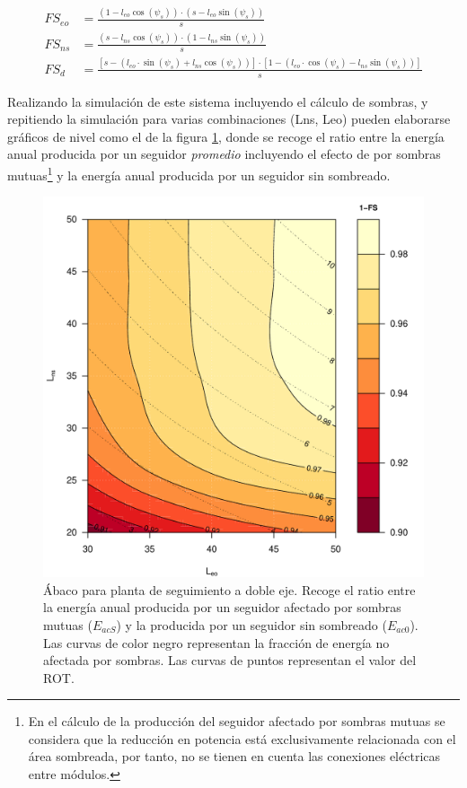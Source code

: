 \begin{align}
FS_{eo} & =\frac{(1-l_{eo}\cos(\psi_{s}))\cdot(s-l_{eo}\sin(\psi_{s}))}{s}\\
FS_{ns} & =\frac{(s-l_{ns}\cos(\psi_{s}))\cdot(1-l_{ns}\sin(\psi_{s}))}{s}\\
FS_{d} & =\frac{\left[s-\left(l_{eo}\cdot\sin(\psi_{s})+l_{ns}\cos(\psi_{s})\right)\right]\cdot\left[1-\left(l_{eo}\cdot\cos(\psi_{s})-l_{ns}\sin(\psi_{s})\right)\right]}{s}
\end{align}

Realizando la simulación de este sistema incluyendo el cálculo de sombras, y repitiendo la simulación para varias combinaciones (Lns, Leo) pueden elaborarse gráficos de nivel como el de la figura \ref{fig:abaco-sombras}, donde se recoge el ratio entre la energía anual producida por un seguidor \emph{promedio} incluyendo el efecto de por sombras mutuas\footnote{En el cálculo de la producción del seguidor afectado por sombras mutuas se considera que la reducción en potencia está exclusivamente relacionada con el área sombreada, por tanto, no se tienen en cuenta las conexiones eléctricas entre módulos.} y la energía anual producida por un seguidor sin sombreado.
\begin{figure}[htbp]
\centering
\includegraphics[height=0.4\textheight]{figuras/AbacoSombras.pdf}
\caption{Ábaco para planta de seguimiento a doble eje. Recoge el ratio entre la energía anual producida por un seguidor afectado por sombras mutuas (\(E_{acS}\)) y la producida por un seguidor sin sombreado (\(E_{ac0}\)). Las curvas de color negro representan la fracción de energía no afectada por sombras. Las curvas de puntos representan el valor del ROT. \label{fig:abaco-sombras}}
\end{figure}

